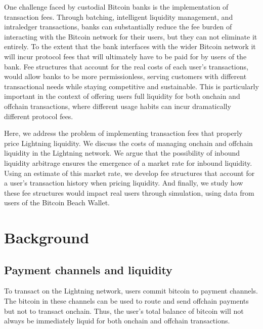 \documentclass[10pt,twocolumn]{article}
\begin{document}
One challenge faced by custodial Bitcoin banks is the implementation of transaction fees.
Through batching, intelligent liquidity management,
and intraledger transactions, banks can substantially reduce
the fee burden of interacting with the Bitcoin network for their users,
but they can not eliminate it entirely.
To the extent that the bank interfaces with the wider Bitcoin network
it will incur protocol fees that will ultimately have to be paid for by
users of the bank.
Fee structures that account for the real costs of each user's transactions,
would allow banks to be more permissionless,
serving customers with different transactional needs
while staying competitive and sustainable.
This is particularly important in the context of
offering users full liquidity for both onchain and offchain transactions,
where different usage habits can incur dramatically
different protocol fees.

Here, we address the problem of implementing
transaction fees that properly price Lightning liquidity.
We discuss the costs of managing onchain
and offchain liquidity in the Lightning network.
We argue that the possibility of inbound liquidity arbitrage
ensures the emergence of a market rate for inbound liquidity.
Using an estimate of this market rate,
we develop fee structures that account for a
user's transaction history when pricing liquidity.
And finally, we study how these fee structures would impact real users
through simulation, using data from users of the Bitcoin Beach Wallet.

\section{Background}

\subsection{Payment channels and liquidity}

To transact on the Lightning network,
users commit bitcoin to payment channels.
The bitcoin in these channels can be used to
route and send offchain payments but not to transact onchain.
Thus, the user's total balance of bitcoin
will not always be immediately liquid for both onchain and offchain transactions.
\end{document}
